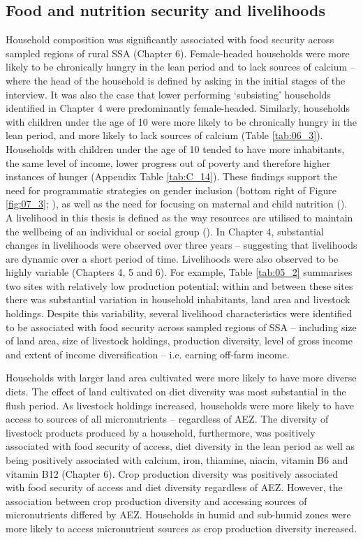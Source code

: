 \subsection{Food and nutrition security and livelihoods}
Household composition was significantly associated with food security across sampled regions of rural SSA (Chapter 6). Female-headed households were more likely to be chronically hungry in the lean period and to lack sources of calcium -- where the head of the household is defined by asking in the initial stages of the interview. It was also the case that lower performing `subsisting' households identified in Chapter 4 were predominantly female-headed. Similarly, households with children under the age of 10 were more likely to be chronically hungry in the lean period, and more likely to lack sources of calcium (Table \ref{tab:06_3}). Households with children under the age of 10 tended to have more inhabitants, the same level of income, lower progress out of poverty and therefore higher instances of hunger (Appendix Table \ref{tab:C_14}). These findings support the need for programmatic strategies on gender inclusion (bottom right of Figure \ref{fig:07_3}; \citealp{Mason2015}), as well as the need for focusing on maternal and child nutrition (\citealp{Sharma2017, DePee2017, Arimond2004}). A livelihood in this thesis is defined as the way resources are utilised to maintain the wellbeing of an individual or social group (\citealp{Blaikie1994}). In Chapter 4, substantial changes in livelihoods were observed over three years -- suggesting that livelihoods are dynamic over a short period of time. Livelihoods were also observed to be highly variable (Chapters 4, 5 and 6). For example, Table \ref{tab:05_2} summarises two sites with relatively low production potential; within and between these sites there was substantial variation in household inhabitants, land area and livestock holdings. Despite this variability, several livelihood characteristics were identified to be associated with food security across sampled regions of SSA -- including size of land area, size of livestock holdings, production diversity, level of gross income and extent of income diversification -- i.e. earning off-farm income.

Households with larger land area cultivated were more likely to have more diverse diets. The effect of land cultivated on diet diversity was most substantial in the flush period. As livestock holdings increased, households were more likely to have access to sources of all micronutrients -- regardless of AEZ. The diversity of livestock products produced by a household, furthermore, was positively associated with food security of access, diet diversity in the lean period as well as being positively associated with calcium, iron, thiamine, niacin, vitamin B6 and vitamin B12 (Chapter 6). Crop production diversity was positively associated with food security of access and diet diversity regardless of AEZ. However, the association between crop production diversity and accessing sources of micronutrients differed by AEZ. Households in humid and sub-humid zones were more likely to access micronutrient sources as crop production diversity increased.

